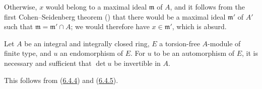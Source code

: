 Otherwise, $x$ would belong to a maximal ideal $\mathfrak{m}$ of $A$, and it
follows from the first Cohen--Seidenberg theorem
(\cite[vol.~I, p.~257, Theorem~3]{I-13}) that there would be a maximal ideal
$\mathfrak{m}'$ of $A'$ such that $\mathfrak{m}=\mathfrak{m}'\cap A$; we
would therefore have $x\in\mathfrak{m}'$, which is absurd.

\begin{corollary}[6.4.6]
\label{II.6.4.6}
Let $A$ be an integral and integrally closed ring, $E$ a torsion-free
$A$-module of finite type, and $u$ an endomorphism of $E$. For $u$ to be an
automorphism of $E$, it is necessary and sufficient that $\det u$ be
invertible in $A$.
\end{corollary}

This follows from (\hyperref[II.6.4.4]{6.4.4}) and
(\hyperref[II.6.4.5]{6.4.5}).

